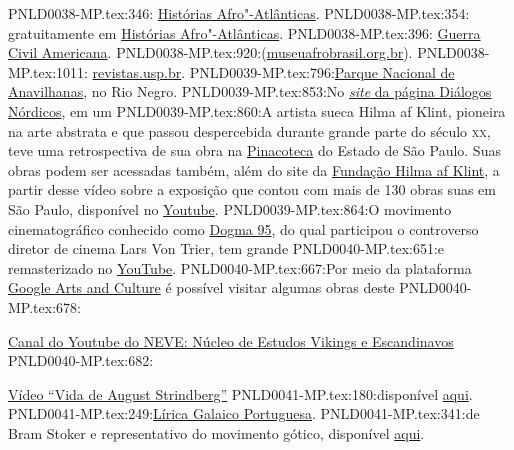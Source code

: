 {{{{{{{{{PNLD0038-MP.tex:346: \href{https://masp.org.br/exposicoes/historias-afro-atlanticas}{Histórias Afro"-Atlânticas}. 
PNLD0038-MP.tex:354:    gratuitamente em \href{https://masp.org.br/exposicoes/historias-afro-atlanticas}{Histórias Afro"-Atlânticas}.
PNLD0038-MP.tex:396:    \href{https://brasilescola.uol.com.br/historiag/guerra-secessao.htm}{Guerra Civil Americana}.
PNLD0038-MP.tex:920:(\href{http://www.museuafrobrasil.org.br/}{museuafrobrasil.org.br}).
PNLD0038-MP.tex:1011:  \href{http://www.revistas.usp.br/eav/article/view/9507}{revistas.usp.br}.
PNLD0039-MP.tex:796:\href{https://pt.wikipedia.org/wiki/Parque_Nacional_de_Anavilhanas}{Parque Nacional de Anavilhanas}, no Rio Negro.
PNLD0039-MP.tex:853:No \href{https://www.dialogosnordicos.com/?fbclid=IwAR0XdcQuRZ3HH0mRrjc-z5BpiSHjWi9uj9mjTTrJ0GWvHTSsVQdf4tA4po8}{\emph{site} da página Diálogos Nórdicos}, em um 
PNLD0039-MP.tex:860:A artista sueca Hilma af Klint, pioneira na arte abstrata e que passou despercebida durante grande parte do século \textsc{xx}, teve uma retrospectiva de sua obra na \href{https://pinacoteca.org.br/en/programacao/hilma-af-klint/}{Pinacoteca} do Estado de São Paulo. Suas obras podem ser acessadas também, além do site da \href{https://www.hilmaafklint.se/en/}{Fundação Hilma af Klint}, a partir desse vídeo sobre a exposição que contou com mais de 130 obras suas em São Paulo, disponível no \href{https://www.youtube.com/watch?v=jBMQSHFEUaw&ab_channel=TVCRECI}{Youtube}.
PNLD0039-MP.tex:864:O movimento cinematográfico conhecido como \href{https://www.institutodecinema.com.br/mais/conteudo/movimentos-do-cinema-o-que-foi-o-dogma-95}{Dogma 95}, do qual participou o controverso diretor de cinema Lars Von Trier, tem grande 
PNLD0040-MP.tex:651:e remasterizado no \href{https://www.youtube.com/watch?v=HH1BjSZYJ-w}{YouTube}.
PNLD0040-MP.tex:667:Por meio da plataforma \href{https://artsandculture.google.com/partner/nordiska-museet}{Google Arts and Culture} é possível visitar algumas obras deste 
PNLD0040-MP.tex:678:\item \href{https://www.youtube.com/channel/UCyi7TQJOK1kyIU6e4pRJrUQ}{Canal do Youtube do NEVE: Núcleo de Estudos Vikings e Escandinavos}
PNLD0040-MP.tex:682:\item \href{https://www.youtube.com/watch?v=dxv7rPx8A5Q}{Vídeo ``Vida de August Strindberg''}
PNLD0041-MP.tex:180:disponível \href{https://www.youtube.com/watch?v=ZevUDlfqyo4&ab_channel=teatrodecontosdefada}{aqui}.
PNLD0041-MP.tex:249:\href{https://www.youtube.com/watch?v=1M_VcqHoQ1M&ab_channel=Am%C3%A9ricoValente}{Lírica Galaico Portuguesa}. 
PNLD0041-MP.tex:341:de Bram Stoker e representativo do movimento gótico, disponível \href{https://www.youtube.com/watch?v=WmRtEHi7Op0&ab_channel=CineAntiquaRed}{aqui}.
}}}}}}}}}
